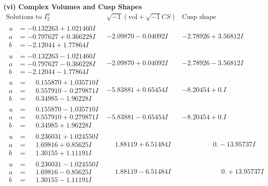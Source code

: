\documentclass[1p]{elsarticle_modified}
\theoremstyle{definition}
\newcommand{\I}{\sqrt{-1}}
\begin{document}
\newpage\flushleft \textbf{(vi) Complex Volumes and Cusp Shapes}
$$\begin{array}{c|c|c}  
\text{Solutions to }I^u_{2}& \I (\text{vol} + \sqrt{-1}CS) & \text{Cusp shape}\\
 \hline 
\begin{aligned}
u &= -0.132263 + 1.021460 I \\
a &= -0.797627 + 0.366228 I \\
b &= -2.12044 + 1.77864 I\end{aligned}
 & -2.09870 - 0.04092 I & -2.78926 + 3.56812 I \\ \hline\begin{aligned}
u &= -0.132263 - 1.021460 I \\
a &= -0.797627 - 0.366228 I \\
b &= -2.12044 - 1.77864 I\end{aligned}
 & -2.09870 + 0.04092 I & -2.78926 - 3.56812 I \\ \hline\begin{aligned}
u &= \phantom{-}0.155870 + 1.035710 I \\
a &= \phantom{-}0.557910 - 0.279871 I \\
b &= \phantom{-}0.34985 - 1.96228 I\end{aligned}
 & -5.83881 + 0.65454 I & -8.20454 + 0. I\phantom{ +0.000000I} \\ \hline\begin{aligned}
u &= \phantom{-}0.155870 - 1.035710 I \\
a &= \phantom{-}0.557910 + 0.279871 I \\
b &= \phantom{-}0.34985 + 1.96228 I\end{aligned}
 & -5.83881 - 0.65454 I & -8.20454 + 0. I\phantom{ +0.000000I} \\ \hline\begin{aligned}
u &= \phantom{-}0.236031 + 1.024550 I \\
a &= \phantom{-}1.69816 + 0.85625 I \\
b &= \phantom{-}1.30155 + 1.11191 I\end{aligned}
 & \phantom{-}1.88119 + 6.51484 I & \phantom{-0.000000 } 0. - 13.95737 I \\ \hline\begin{aligned}
u &= \phantom{-}0.236031 - 1.024550 I \\
a &= \phantom{-}1.69816 - 0.85625 I \\
b &= \phantom{-}1.30155 - 1.11191 I\end{aligned}
 & \phantom{-}1.88119 - 6.51484 I & \phantom{-0.000000 -}0. + 13.95737 I \\ \hline\begin{aligned}

\end{aligned}
\end{array}$$
\end{document}
